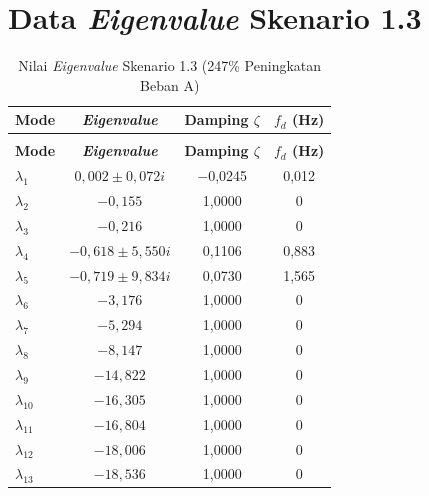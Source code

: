 \section{Data \textit{Eigenvalue} Skenario 1.3}
\begingroup
\fontsize{11}{13.2}\selectfont
\setlength{\tabcolsep}{7pt}
\begin{longtable}{>{\centering\arraybackslash}m{1.5cm} c c c} \caption[]{Nilai
	\textit{Eigenvalue} Skenario 1.3 (247\% Peningkatan Beban A)}
	\label{tab:eigenvalue_sk13_lampiran} \\
	\toprule
	\textbf{Mode} & \textbf{\textit{Eigenvalue}} & \textbf{Damping $\zeta$} &
	\textbf{$f_d$ (Hz)} \\
	\midrule
	\endfirsthead
	\multicolumn{4}{l}{\textit{(lanjutan)}} \\
	\toprule
	\textbf{Mode} & \textbf{\textit{Eigenvalue}} & \textbf{Damping $\zeta$} &
	\textbf{$f_d$ (Hz)} \\
	\midrule
	\endhead
	\bottomrule
	\endfoot
	$\lambda_1$  & $0{,}002 \pm 0{,}072i$            & $-$0,0245 & 0,012 \\
	$\lambda_2$  & $-0{,}155$                         & 1,0000 & 0 \\
	$\lambda_3$  & $-0{,}216$                         & 1,0000 & 0 \\
	$\lambda_4$  & $-0{,}618 \pm 5{,}550i$            & 0,1106 & 0,883 \\
	$\lambda_5$  & $-0{,}719 \pm 9{,}834i$            & 0,0730 & 1,565 \\
	$\lambda_6$  & $-3{,}176$                         & 1,0000 & 0 \\
	$\lambda_7$  & $-5{,}294$                         & 1,0000 & 0 \\
	$\lambda_8$  & $-8{,}147$                         & 1,0000 & 0 \\
	$\lambda_9$  & $-14{,}822$                        & 1,0000 & 0 \\
	$\lambda_{10}$ & $-16{,}305$                      & 1,0000 & 0 \\
	$\lambda_{11}$ & $-16{,}804$                      & 1,0000 & 0 \\
	$\lambda_{12}$ & $-18{,}006$                      & 1,0000 & 0 \\
	$\lambda_{13}$ & $-18{,}536$                      & 1,0000 & 0 \\
\end{longtable}
\par
\endgroup

